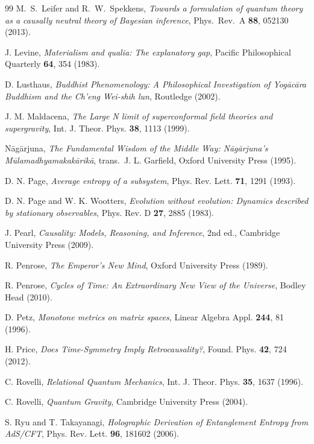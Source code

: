 \documentclass[12pt,a4paper,openany]{book}
\begin{document}
\begin{thebibliography}{99}
M.~S.~Leifer and R.~W.~Spekkens,
\emph{Towards a formulation of quantum theory as a causally neutral theory of Bayesian inference},
Phys.\ Rev.\ A \textbf{88}, 052130 (2013).

J. Levine, \emph{Materialism and qualia: The explanatory gap}, Pacific Philosophical Quarterly \textbf{64}, 354 (1983).

D. Lusthaus, \emph{Buddhist Phenomenology: A Philosophical Investigation of Yogācāra Buddhism and the Ch'eng Wei-shih lun}, Routledge (2002).

J. M. Maldacena, \emph{The Large N limit of superconformal field theories and supergravity}, Int. J. Theor. Phys. \textbf{38}, 1113 (1999).

Nāgārjuna, \emph{The Fundamental Wisdom of the Middle Way: Nāgārjuna's Mūlamadhyamakakārikā}, trans.\ J. L. Garfield, Oxford University Press (1995).


D. N. Page, \emph{Average entropy of a subsystem}, Phys. Rev. Lett. \textbf{71}, 1291 (1993).

D. N. Page and W. K. Wootters, \emph{Evolution without evolution: Dynamics described by stationary observables}, Phys. Rev. D \textbf{27}, 2885 (1983).

J. Pearl, \emph{Causality: Models, Reasoning, and Inference}, 2nd ed., Cambridge University Press (2009).

R. Penrose, \emph{The Emperor's New Mind}, Oxford University Press (1989).

R. Penrose, \emph{Cycles of Time: An Extraordinary New View of the Universe}, Bodley Head (2010).

D. Petz, \emph{Monotone metrics on matrix spaces}, Linear Algebra Appl. \textbf{244}, 81 (1996).

H. Price, \emph{Does Time-Symmetry Imply Retrocausality?}, Found. Phys. \textbf{42}, 724 (2012).

C. Rovelli, \emph{Relational Quantum Mechanics}, Int. J. Theor. Phys. \textbf{35}, 1637 (1996).

C. Rovelli, \emph{Quantum Gravity}, Cambridge University Press (2004).

S. Ryu and T. Takayanagi, \emph{Holographic Derivation of Entanglement Entropy from AdS/CFT}, Phys. Rev. Lett. \textbf{96}, 181602 (2006).


\end{thebibliography}
\end{document}
